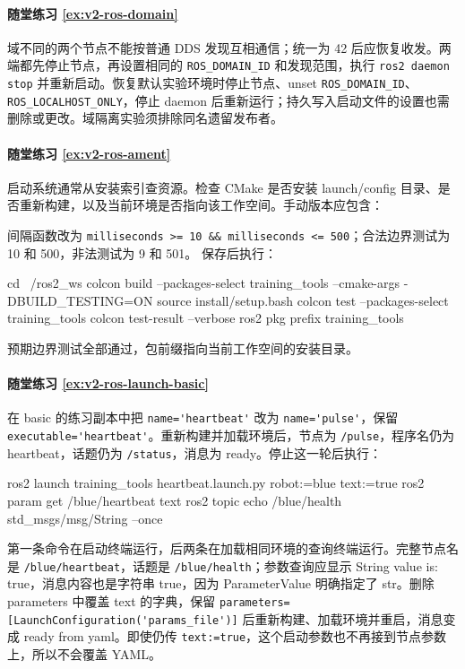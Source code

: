 \paragraph*{随堂练习 \ref{ex:v2-ros-domain}}
\begin{solution}
域不同的两个节点不能按普通 DDS 发现互相通信；统一为 42 后应恢复收发。两端都先停止节点，再设置相同的 \texttt{ROS\_DOMAIN\_ID} 和发现范围，执行 \texttt{ros2 daemon stop} 并重新启动。恢复默认实验环境时停止节点、unset \texttt{ROS\_DOMAIN\_ID}、\texttt{ROS\_LOCALHOST\_ONLY}，停止 daemon 后重新运行；持久写入启动文件的设置也需删除或更改。域隔离实验须排除同名遗留发布者。
\end{solution}

\paragraph*{随堂练习 \ref{ex:v2-ros-ament}}
\begin{solution}
启动系统通常从安装索引查资源。检查 CMake 是否安装 launch/config 目录、是否重新构建，以及当前环境是否指向该工作空间。手动版本应包含：
间隔函数改为 \texttt{milliseconds >= 10 \&\& milliseconds <= 500}；合法边界测试为 10 和 500，非法测试为 9 和 501。
保存后执行：
\begin{tbash}
cd ~/ros2_ws
colcon build --packages-select training_tools --cmake-args -DBUILD_TESTING=ON
source install/setup.bash
colcon test --packages-select training_tools
colcon test-result --verbose
ros2 pkg prefix training_tools
\end{tbash}
预期边界测试全部通过，包前缀指向当前工作空间的安装目录。
\end{solution}

\paragraph*{随堂练习 \ref{ex:v2-ros-launch-basic}}
\begin{solution}
在 basic 的练习副本中把 \nolinkurl{name='heartbeat'} 改为 \nolinkurl{name='pulse'}，保留 \nolinkurl{executable='heartbeat'}。重新构建并加载环境后，节点为 \texttt{/pulse}，程序名仍为 heartbeat，话题仍为 \texttt{/status}，消息为 ready。停止这一轮后执行：
\begin{tbash}
ros2 launch training_tools heartbeat.launch.py robot:=blue text:=true
ros2 param get /blue/heartbeat text
ros2 topic echo /blue/health std_msgs/msg/String --once
\end{tbash}
第一条命令在启动终端运行，后两条在加载相同环境的查询终端运行。完整节点名是 \nolinkurl{/blue/heartbeat}，话题是 \nolinkurl{/blue/health}；参数查询应显示 String value is: true，消息内容也是字符串 true，因为 ParameterValue 明确指定了 str。删除 parameters 中覆盖 text 的字典，保留 \nolinkurl{parameters=[LaunchConfiguration('params_file')]} 后重新构建、加载环境并重启，消息变成 ready from yaml。即使仍传 \texttt{text:=true}，这个启动参数也不再接到节点参数上，所以不会覆盖 YAML。
\end{solution}

